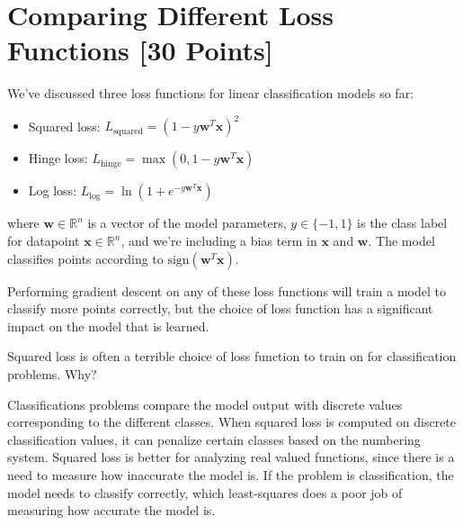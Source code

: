 


\newpage
\section{Comparing Different Loss Functions [30 Points]}

We've discussed three loss functions for linear classification models so far:
\begin{itemize}
\item Squared loss: $L_\text{squared} = (1 - y\mathbf{w}^T\mathbf{x})^2$
\item Hinge loss: $L_\text{hinge} = \max(0, 1 - y\mathbf{w}^T\mathbf{x})$
\item Log loss: $L_\text{log} = \ln(1 + e^{-y\mathbf{w}^T\mathbf{x}})$
\end{itemize}
where $\mathbf{w} \in \mathbb{R}^n$ is a vector of the model parameters, $y \in \{-1,1\}$ is the class label for datapoint $\mathbf{x} \in \mathbb{R}^n$, and we're including a bias term in $\mathbf{x}$ and $\mathbf{w}$.  The model classifies points according to $\text{sign}(\mathbf{w}^T\mathbf{x})$.

Performing gradient descent on any of these loss functions will train a model to classify more points correctly, but the choice of loss function has a significant impact on the model that is learned.

\problem[3]
Squared loss is often a terrible choice of loss function to train on for classification problems.  Why?

\begin{solution}
  Classifications problems compare the model output with discrete values corresponding to the different classes. When squared loss is computed on discrete classification values, it can penalize certain classes based on the numbering system. Squared loss is better for analyzing real valued functions, since there is a need to measure how inaccurate the model is. If the problem is classification, the model needs to classify correctly, which least-squares does a poor job of measuring how accurate the model is.
\end{solution}

